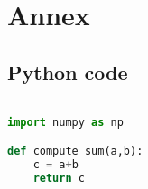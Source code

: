 
\chapter*{Annex}
\section*{Python code}\label{anexo1}
\begin{lstlisting}[language=Python]

import numpy as np

def compute_sum(a,b):
	c = a+b
	return c

\end{lstlisting}
